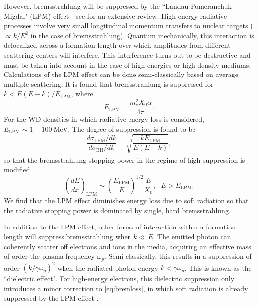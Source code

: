 \documentclass[twocolumn, preprintnumbers,amsmath,amssymb,prd, superscriptaddress]{revtex4}
\def\r{\right)}
\def\l{\left(}
\begin{document}
\begin{appendices}
However, bremsstrahlung will be suppressed by the ``Landau-Pomeranchuk-Migdal" (LPM) effect - see \cite{Klein:1998du} for an extensive review.
High-energy radiative processes involve very small longitudinal momentum transfers to nuclear targets ($\propto k/E^2$ in the case of bremsstrahlung).
Quantum mechanically, this interaction is delocalized across a formation length over which amplitudes from different scattering centers will interfere.
This interference turns out to be destructive and must be taken into account in the case of high energies or high-density mediums.
Calculations of the LPM effect can be done semi-classically based on average multiple scattering.
It is found that bremsstrahlung is suppressed for $k < E(E-k)/E_\text{LPM}$, where
\begin{equation}
\label{eq:LPM}
E_\text{LPM} = \frac{m_e^2 X_0 \alpha}{4 \pi}.
\end{equation}
For the WD densities in which radiative energy loss is considered, $E_\text{LPM} \sim 1-100 ~\text{MeV}$.
The degree of suppression is found to be
\begin{equation}
\frac{d\sigma_\text{LPM}/dk}{d\sigma_\text{BH}/dk} = \sqrt{\frac{k E_\text{LPM}}{E (E-k)}},
\end{equation}
so that the bremsstrahlung stopping power in the regime of high-suppression is modified
\begin{equation}
\label{eq:bremloss}
\l\frac{dE}{dx}\r_\text{LPM} \sim \l\frac{E_\text{LPM}}{E} \r^{1/2} \frac{E}{X_0}, ~~~ E>E_\text{LPM}.
\end{equation}
We find that the LPM effect diminishes energy loss due to soft radiation so that the radiative stopping power is dominated by single, hard bremsstrahlung.

In addition to the LPM effect, other forms of interaction within a formation length will suppress bremsstrahlung when $k \ll E$.
The emitted photon can coherently scatter off electrons and ions in the media, acquiring an effective mass of order the plasma frequency $\omega_p$.
Semi-classically, this results in a suppression of order $(k/\gamma \omega_p)^2$ when the radiated photon energy $k < \gamma \omega_p$.
This is known as the ``dielectric effect".
For high-energy electrons, this dielectric suppression only introduces a minor correction to \eqref{eq:bremloss}, in which soft radiation is already suppressed by the LPM effect \cite{Klein:1998du}.


\end{appendices}
\end{document}
